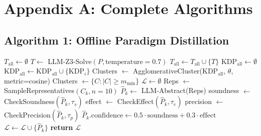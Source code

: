 
\section{Appendix A: Complete Algorithms}

\subsection{Algorithm 1: Offline Paradigm Distillation}

\begin{algorithm}
\caption{PRISM-Offline(Puzzles, LLM, Z3, $\theta$, $m_{\min}$, $\tau_s$, $\tau_e$, $\tau_p$)}
\begin{algorithmic}[1]
\STATE $T_{\text{all}} \leftarrow \emptyset$ \quad {}
        \STATE $T \leftarrow$ LLM-Z3-Solve$(P, \text{temperature}=0.7)$
            \STATE $T_{\text{all}} \leftarrow T_{\text{all}} \cup \{T\}$
        \ENDIF
    \ENDFOR
\ENDFOR
\STATE {}
\STATE $\text{KDP}_{\text{all}} \leftarrow \emptyset$
            \STATE $\text{KDP}_{\text{all}} \leftarrow \text{KDP}_{\text{all}} \cup \{\text{KDP}_i\}$
        \ENDIF
    \ENDFOR
\ENDFOR
\STATE {}
\STATE Clusters $\leftarrow$ AgglomerativeCluster(KDP$_{\text{all}}$, $\theta$, metric=cosine)
\STATE Clusters $\leftarrow \{C : |C| \geq m_{\min}\}$ \quad {}
\STATE {}
\STATE $\mathcal{L} \leftarrow \emptyset$
    \STATE Reps $\leftarrow$ SampleRepresentatives$(C_k, n=10)$
    \STATE $\hat{P}_k \leftarrow$ LLM-Abstract(Reps)
        \STATE soundness $\leftarrow$ CheckSoundness$(\hat{P}_k, \tau_s)$
            \STATE effect $\leftarrow$ CheckEffect$(\hat{P}_k, \tau_e)$
                \STATE precision $\leftarrow$ CheckPrecision$(\hat{P}_k, \tau_p)$
                    \STATE $\hat{P}_k.\text{confidence} \leftarrow 0.5 \cdot \text{soundness} + 0.3 \cdot \text{effect}$
                    \STATE $\mathcal{L} \leftarrow \mathcal{L} \cup \{\hat{P}_k\}$
                \ENDIF
            \ENDIF
        \ENDIF
    \ENDIF
\ENDFOR
\STATE \textbf{return} $\mathcal{L}$
\end{algorithmic}
\end{algorithm}


